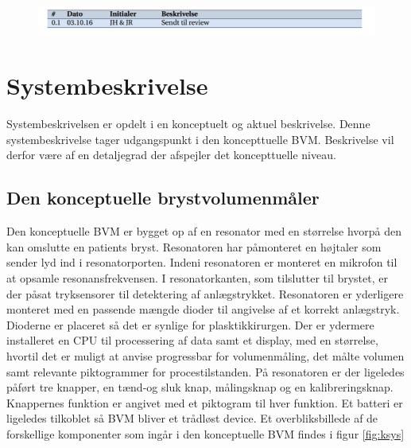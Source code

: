 			\begin{figure}[htb]
				\centering
				\includegraphics[width=5in]{versionshisv01.png}
			\end{figure}
		
	\section{Systembeskrivelse}
	
Systembeskrivelsen er opdelt i en konceptuelt og aktuel beskrivelse.
Denne systembeskrivelse tager udgangspunkt i den koncepttuelle BVM. Beskrivelse vil derfor være af en detaljegrad der afspejler det koncepttuelle niveau.

		\subsection{Den konceptuelle brystvolumenmåler} \label{subsec:BVMopb}
		
		Den konceptuelle BVM er bygget op af en resonator med en størrelse hvorpå den kan omslutte en patients bryst. Resonatoren har påmonteret en højtaler som sender lyd ind i resonatorporten. Indeni resonatoren er monteret en mikrofon til at opsamle resonansfrekvensen. I resonatorkanten, som tilslutter til brystet, er der påsat tryksensorer til detektering af anlægstrykket. Resonatoren er yderligere monteret med en passende mængde dioder til angivelse af et korrekt anlægstryk. Dioderne er placeret så det er synlige for plasktikkirurgen. Der er ydermere installeret en CPU til processering af data samt et display, med en størrelse, hvortil det er muligt at anvise progressbar for volumenmåling, det målte volumen samt relevante piktogrammer for procestilstanden. På resonatoren er der ligeledes påført tre knapper, en tænd-og sluk knap, målingsknap og en kalibreringsknap. Knappernes funktion er angivet med et piktogram til hver funktion. Et batteri er ligeledes tilkoblet så BVM bliver et trådløst device.   Et overbliksbillede af de forskellige komponenter som ingår i den konceptuelle BVM findes i figur \ref{fig:ksys} 
		
		
\vspace{5mm}  
		
